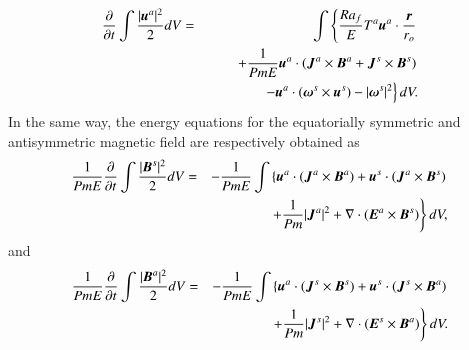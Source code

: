 %
\begin{eqnarray}
\displaystyle
\frac{\partial}{\partial t}
 \int \frac{|\mbox{\boldmath$u$}^a|^2}{2} d V 
 & = & \displaystyle
\int \left\{
      \frac{Ra_f}{E}T^a \mbox{\boldmath$u$}^a\cdot \frac{\mbox{\boldmath$r$}}{r_{o}}
     \right.
\nonumber \\
& & \displaystyle
\hspace*{2em}
     \left.
    + \frac{1}{Pm E} \mbox{\boldmath$u$}^a \cdot
                (\mbox{\boldmath$J$}^a \times \mbox{\boldmath$B$}^a
                +\mbox{\boldmath$J$}^s \times \mbox{\boldmath$B$}^s)
      \right.
\nonumber \\
& & \displaystyle
\hspace*{3em}
      \left.
     - \mbox{\boldmath$u$}^a \cdot 
       (\mbox{\boldmath$\omega$}^s \times \mbox{\boldmath$u$}^s)
    - |\mbox{\boldmath$\omega$}^s|^2 
      \right\} d V.
\label{eq:energy_ua}
\end{eqnarray}
%
In the same way, the energy equations for the equatorially symmetric and antisymmetric magnetic field are respectively obtained as
%
\begin{eqnarray}
\displaystyle
\frac{1}{Pm E}\frac{\partial}{\partial t}
 \int \frac{|\mbox{\boldmath$B$}^s|^2}{2} d V
 & = & - \frac{1}{Pm E}\int \left\{
      \mbox{\boldmath$u$}^a \cdot 
          ( \mbox{\boldmath$J$}^a \times \mbox{\boldmath$B$}^a )
    + \mbox{\boldmath$u$}^s \cdot 
          ( \mbox{\boldmath$J$}^a \times \mbox{\boldmath$B$}^s )
    \right.
\nonumber \\
\hspace{3em}
&& \displaystyle
    \left.
    + \frac{1}{Pm} |\mbox{\boldmath$J$}^a|^2
    + \nabla \cdot ( \mbox{\boldmath$E$}^a \times \mbox{\boldmath$B$}^s ) 
      \right\} d V,
\label{eq:energy_Bs}
\end{eqnarray}
%
and 
%
\begin{eqnarray}
\displaystyle
\frac{1}{Pm E}\frac{\partial}{\partial t}
 \int \frac{|\mbox{\boldmath$B$}^a|^2}{2} d V 
& = & \displaystyle
- \frac{1}{Pm E}\int \left\{
      \mbox{\boldmath$u$}^a \cdot 
          ( \mbox{\boldmath$J$}^s \times \mbox{\boldmath$B$}^s )
    + \mbox{\boldmath$u$}^s \cdot ( \mbox{\boldmath$J$}^s \times \mbox{\boldmath$B$}^a )
    \right.
\nonumber \\
\hspace{3em}
 & & \displaystyle
    \left.
    + \frac{1}{Pm} |\mbox{\boldmath$J$}^s|^2
    + \nabla \cdot ( \mbox{\boldmath$E$}^s \times \mbox{\boldmath$B$}^a ) 
      \right\} d V.
\label{eq:energy_Ba}
\end{eqnarray}

